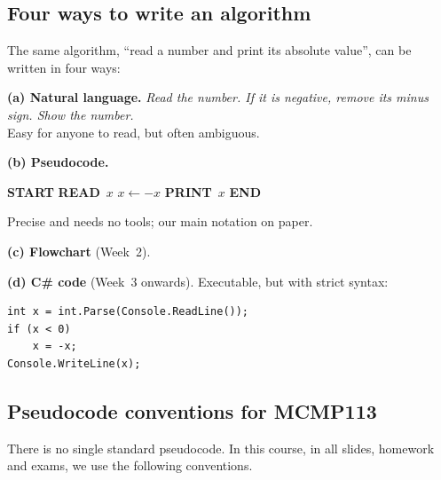 \documentclass[11pt,a4paper]{article}
\newcommand{\READ}{\textbf{READ}\ }
\newcommand{\PRINT}{\textbf{PRINT}\ }
\newcommand{\START}{\State \textbf{START}}
\newcommand{\STOP}{\State \textbf{END}}
\begin{document}
\subsection{Four ways to write an algorithm}
The same algorithm, ``read a number and print its absolute value'', can be written in four ways:

\begin{center}
\begin{minipage}[t]{0.47\linewidth}
\textbf{(a) Natural language.} \emph{Read the number. If it is negative, remove its minus sign. Show the number.}\\[1mm]
{\small Easy for anyone to read, but often ambiguous.}

\medskip
\textbf{(b) Pseudocode.}\vspace{-2mm}
\begin{pseudobox}
\begin{algorithmic}[1]
\START
\State \READ $x$
  \State $x \gets -x$
\EndIfX
\State \PRINT $x$
\STOP
\end{algorithmic}
\end{pseudobox}
{\small Precise and needs no tools; our main notation on paper.}
\end{minipage}\hfill
\begin{minipage}[t]{0.47\linewidth}
\textbf{(c) Flowchart} (Week~2).\\[1mm]
\centering
{}
\end{minipage}
\end{center}

\textbf{(d) C\# code} (Week~3 onwards). Executable, but with strict syntax:
\begin{lstlisting}
int x = int.Parse(Console.ReadLine());
if (x < 0)
    x = -x;
Console.WriteLine(x);
\end{lstlisting}

\subsection{Pseudocode conventions for MCMP113}\label{sec:conventions}
There is no single standard pseudocode. In this course, in all slides, homework and exams, we use the following conventions.
\end{document}

